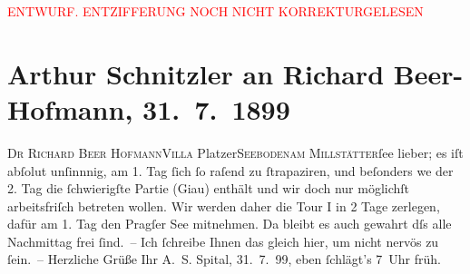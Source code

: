 
\begin{center}
            \textcolor{red}{ENTWURF. ENTZIFFERUNG NOCH NICHT KORREKTURGELESEN}
                      \end{center}
            
               \section[Arthur Schnitzler an Richard Beer-Hofmann, 31. 7. 1899]{ Arthur Schnitzler an Richard Beer-Hofmann, 31. 7. 1899}\nopagebreak{}\rehead{ }\begin{ledgroupsized}[t]{13cm}\normalsize\beginnumbering{} \toendnotes[C]{\smallbreak\pagebreak[2]} 
\pstart{}{\pb}\textsc{Dr Richard Beer Hofmann}\pend{}\pstart{}\textsc{Villa} Platzer\pend{}\pstart{}\textsc{Seeboden}\pend{}\pstart{}\textsc{am Millstätter}ſee\pend{}{\bigskip}\pstart
           \noindent{}{\pb}lieber; es iſt abſolut unſinnnig, am 1. Tag ſich ſo raſend zu
               ſtrapaziren, und beſonders we{\geminationn} der 2. Tag die
               ſchwierigſte Partie (Giau) enthält und  wir doch nur möglichſt arbeitsfriſch betreten
               wollen. Wir werden daher die Tour I in 2 Tage zerlegen, dafür am 1. Tag den Pragſer See mitnehmen. Da{\geminationn} bleibt es auch gewahrt dſs alle Nachmittag frei
               ſind. – Ich ſchreibe Ihnen das gleich hier, um nicht nervös zu ſein. –\pend
           \pstart Herzliche Grüße Ihr \spacefill\mbox{A. S.}\pend{}\pstart
           Spital, 31. 7. 99, eben ſchlägt’s
                     7 Uhr früh.\pend
           \endnumbering{}\end{ledgroupsized}  \newcommand{\dateiname}{L00953}\newcommand{\titel}{Arthur Schnitzler an Richard Beer-Hofmann, 31. 7. 1899}\newcommand{\editorInnen}{Martin Anton Müller und Gerd-Hermann Susen}
      